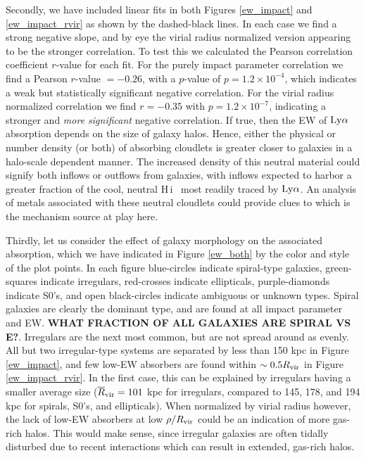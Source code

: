 \documentclass[twocolumn,tighten]{aastex62}
\newcommand{\HI}{\mbox{H\,{\sc i}} }
\begin{document}
Secondly, we have included linear fits in both Figures \ref{ew_impact} and \ref{ew_impact_rvir} as shown by the dashed-black lines. In each case we find a strong negative slope, and by eye the virial radius normalized version appearing to be the stronger correlation. To test this we calculated the Pearson correlation coefficient $r$-value for each fit. For the purely impact parameter correlation we find a Pearson $r$-value $=-0.26$, with a $p$-value of $p = 1.2 \times 10^{-4}$, which indicates a weak but statistically significant negative correlation. For the virial radius normalized correlation we find $r = -0.35$ with $p = 1.2 \times 10^{-7}$, indicating a stronger and \emph{more significant} negative correlation. If true, then the EW of $\rm Ly\alpha$ absorption depends on the size of galaxy halos. Hence, either the physical or number density (or both) of absorbing cloudlets is greater closer to galaxies in a halo-scale dependent manner. The increased density of this neutral material could signify both inflows or outflows from galaxies, with inflows expected to harbor a greater fraction of the cool, neutral \HI~most readily traced by $\rm Ly\alpha$. An analysis of metals associated with these neutral cloudlets could provide clues to which is the mechanism source at play here.

Thirdly, let us consider the effect of galaxy morphology on the associated absorption, which we have indicated in Figure \ref{ew_both} by the color and style of the plot points. In each figure blue-circles indicate spiral-type galaxies, green-squares indicate irregulars, red-crosses indicate ellipticals, purple-diamonds indicate S0's, and open black-circles indicate ambiguous or unknown types. Spiral galaxies are clearly the dominant type, and are found at all impact parameter and EW. \textbf{WHAT FRACTION OF ALL GALAXIES ARE SPIRAL VS E?}. Irregulars are the next most common, but are not spread around as evenly. All but two irregular-type systems are separated by less than 150 kpc in Figure \ref{ew_impact}, and few low-EW absorbers are found within $\sim 0.5 R_{\rm vir}$ in Figure \ref{ew_impact_rvir}. In the first case, this can be explained by irregulars having a smaller average size ($\overline{R}_{\rm vir} = 101$ kpc for irregulars, compared to 145, 178, and 194 kpc for spirals, S0's, and ellipticals). When normalized by virial radius however, the lack of low-EW absorbers at low $\rho / R_{\rm vir}$ could be an indication of more gas-rich halos. This would make sense, since irregular galaxies are often tidally disturbed due to recent interactions which can result in extended, gas-rich halos.
\end{document}
